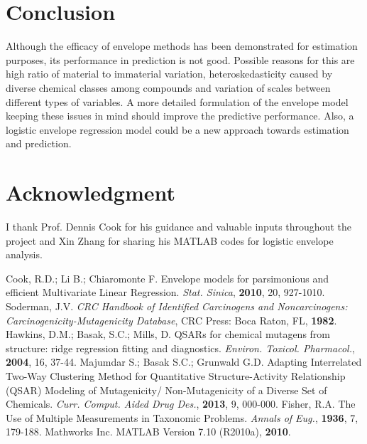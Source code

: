 \documentclass[8pt]{llncs}
\begin{document}
\begin{multicols}{2}
\section{Conclusion}
Although the efficacy of envelope methods has been demonstrated for estimation purposes, its performance in prediction is not good. Possible reasons for this are high ratio of material to immaterial variation, heteroskedasticity caused by diverse chemical classes among compounds and variation of scales between different types of variables. A more detailed formulation of the envelope model keeping these issues in mind should improve the predictive performance. Also, a logistic envelope regression model could be a new approach towards estimation and prediction.

\section*{Acknowledgment}I thank Prof. Dennis Cook for his guidance and valuable inputs throughout the project and Xin Zhang for sharing his MATLAB codes for logistic envelope analysis.

\begin{thebibliography}{99}
Cook, R.D.; Li B.; Chiaromonte F. Envelope models for parsimonious and efficient Multivariate Linear Regression. \textit{Stat. Sinica}, \textbf{2010}, 20, 927-1010.
Soderman, J.V. \textit{CRC Handbook of Identified Carcinogens and Noncarcinogens: Carcinogenicity-Mutagenicity Database}, CRC Press: Boca Raton, FL, \textbf{1982}.
Hawkins, D.M.; Basak, S.C.; Mills, D. QSARs for chemical mutagens from structure: ridge regression fitting and diagnostics. \textit{Environ. Toxicol. Pharmacol.}, \textbf{2004}, 16, 37-44.
Majumdar S.; Basak S.C.; Grunwald G.D. Adapting Interrelated Two-Way Clustering Method for Quantitative 
Structure-Activity Relationship (QSAR) Modeling of Mutagenicity/ Non-Mutagenicity of a Diverse Set of Chemicals. \textit{Curr. Comput. Aided Drug Des.}, \textbf{2013}, 9, 000-000.
Fisher, R.A. The Use of Multiple Measurements in Taxonomic Problems. \textit{Annals of Eug.}, \textbf{1936}, 7, 179-188.
Mathworks Inc. MATLAB Version 7.10 (R2010a), \textbf{2010}.

\end{thebibliography}
\end{multicols}
\end{document}

